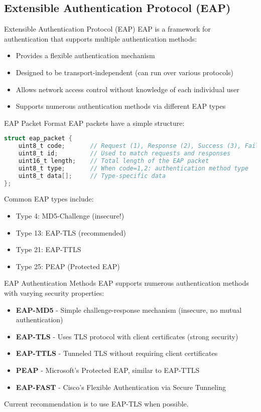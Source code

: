 \subsection{Extensible Authentication Protocol (EAP)}

\begin{definition}{Extensible Authentication Protocol (EAP)}
EAP is a framework for authentication that supports multiple authentication methods:
\begin{itemize}
    \item Provides a flexible authentication mechanism
    \item Designed to be transport-independent (can run over various protocols)
    \item Allows network access control without knowledge of each individual user
    \item Supports numerous authentication methods via different EAP types
\end{itemize}
\end{definition}

\begin{code}{EAP Packet Format}
EAP packets have a simple structure:
\begin{lstlisting}[language=C, style=basesmol]
struct eap_packet {
    uint8_t code;       // Request (1), Response (2), Success (3), Failure (4)
    uint8_t id;         // Used to match requests and responses
    uint16_t length;    // Total length of the EAP packet
    uint8_t type;       // When code=1,2: authentication method type
    uint8_t data[];     // Type-specific data
};
\end{lstlisting}

Common EAP types include:
\begin{itemize}
    \item Type 4: MD5-Challenge (insecure!)
    \item Type 13: EAP-TLS (recommended)
    \item Type 21: EAP-TTLS
    \item Type 25: PEAP (Protected EAP)
\end{itemize}
\end{code}

\begin{concept}{EAP Authentication Methods}
EAP supports numerous authentication methods with varying security properties:
\begin{itemize}
    \item \textbf{EAP-MD5} - Simple challenge-response mechanism (insecure, no mutual authentication)
    \item \textbf{EAP-TLS} - Uses TLS protocol with client certificates (strong security)
    \item \textbf{EAP-TTLS} - Tunneled TLS without requiring client certificates
    \item \textbf{PEAP} - Microsoft's Protected EAP, similar to EAP-TTLS
    \item \textbf{EAP-FAST} - Cisco's Flexible Authentication via Secure Tunneling
\end{itemize}
Current recommendation is to use EAP-TLS when possible.
\end{concept}

